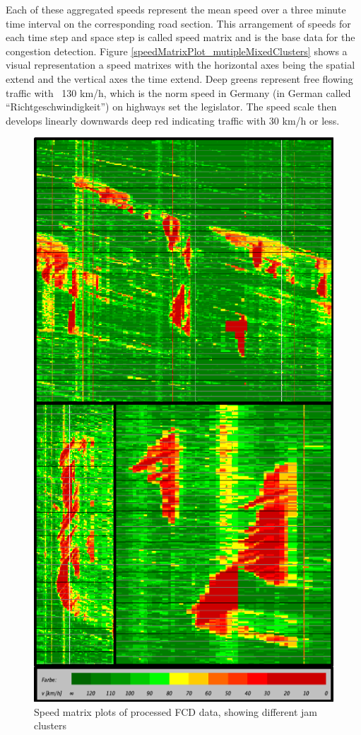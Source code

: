 \documentclass[a4paper,12pt]{report}
\begin{document}

Each of these aggregated speeds represent the mean speed over a three minute time interval on the corresponding road section. This arrangement of speeds for each time step and space step is called speed matrix and is the base data for the congestion detection. Figure \ref{speedMatrixPlot_mutipleMixedClusters} shows a visual representation a speed matrixes with the horizontal axes being the spatial extend and the vertical axes the time extend. Deep greens represent free flowing traffic with ~130 km/h, which is the norm speed in Germany (in German called “Richtgeschwindigkeit”) on highways set the legislator. The speed scale then develops linearly downwards deep red indicating traffic with 30 km/h or less. 

\begin{figure}[h]
	\centering
	\includegraphics[scale=0.8]{./assets/SpeedMatrixPlot_mutiple}
	\caption{Speed matrix plots of processed FCD data, showing different jam clusters}
	\label{img:speedMatrixPlot_mutipleMixedClusters}
\end{figure}
\end{document}

